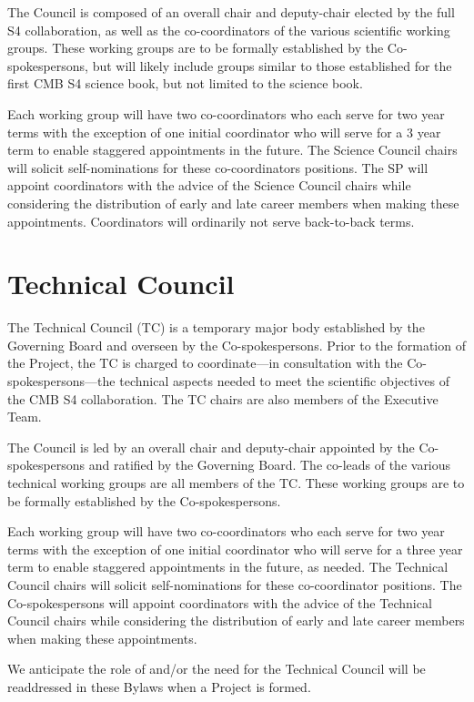 \documentclass[12pt]{article}
\newcommand{\exec}{{Executive Team}}
\begin{document}
The Council is composed of an overall chair and deputy-chair elected by the full S4 collaboration, as well as the co-coordinators of the various scientific working groups. These working groups are to be formally established by the Co-spokespersons,
but will likely include groups similar to those established for the first CMB S4 science book, but not limited to the science book. 

Each working group will have two co-coordinators who each serve for two year terms with the exception of one initial coordinator who will serve for a 3 year term to enable staggered appointments in the future.  The Science Council chairs will solicit self-nominations for these co-coordinators positions. The SP will appoint coordinators with the advice of the Science Council chairs while considering the distribution of early and late career members when making these appointments. Coordinators will ordinarily not serve back-to-back terms.


\section{Technical Council}
The Technical Council (TC) is a temporary major body established by the Governing Board and overseen by the Co-spokespersons. Prior to the formation of the Project, the TC is charged to coordinate---in consultation with the Co-spokespersons---the technical aspects needed to meet the scientific objectives of the CMB S4 collaboration. The TC chairs are also members of the \exec. 

The Council is led by an overall chair and deputy-chair appointed by the Co-spokespersons and ratified by the Governing Board.  The co-leads of the various technical working groups are all members of the TC.  These working groups are to be formally established by the Co-spokespersons.   

Each working group will have two co-coordinators who each serve for two year terms with the exception of one initial coordinator who will serve for a three year term to enable staggered appointments in the future, as needed.  The Technical Council chairs will solicit self-nominations for these co-coordinator positions. The Co-spokespersons will appoint coordinators with the advice of the Technical Council chairs while considering the distribution of early and late career members when making these appointments.

We anticipate the role of and/or the need for the Technical Council will be readdressed in these Bylaws when a Project is formed.
\end{document}

